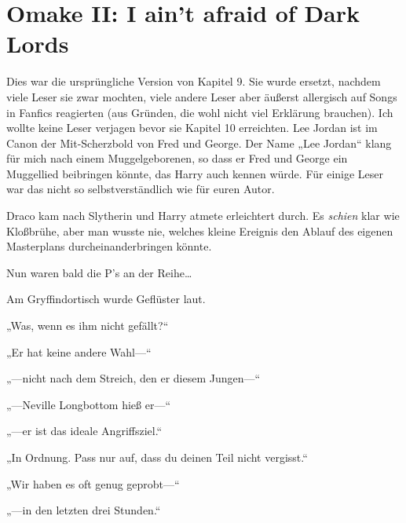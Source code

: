 


\section{Omake II: I ain’t afraid of Dark Lords}

Dies war die ursprüngliche Version von Kapitel 9. Sie wurde ersetzt, nachdem viele Leser sie zwar mochten, viele andere Leser aber äußerst allergisch auf Songs in Fanfics reagierten (aus Gründen, die wohl nicht viel Erklärung brauchen). Ich wollte keine Leser verjagen bevor sie Kapitel 10 erreichten.
Lee Jordan ist im Canon der Mit-Scherzbold von Fred und George. Der Name „Lee Jordan“ klang für mich nach einem Muggelgeborenen, so dass er Fred und George ein Muggellied beibringen könnte, das Harry auch kennen würde. Für einige Leser war das nicht so selbstverständlich wie für euren Autor.

\later

Draco kam nach Slytherin und Harry atmete erleichtert durch. Es \emph{schien} klar wie Kloßbrühe, aber man wusste nie, welches kleine Ereignis den Ablauf des eigenen Masterplans durcheinanderbringen könnte.

Nun waren bald die P’s an der Reihe…

Am Gryffindortisch wurde Geflüster laut.
\begin{em}
„Was, wenn es ihm nicht gefällt?“

„Er hat keine andere Wahl—“

„—nicht nach dem Streich, den er diesem Jungen—“

„—Neville Longbottom hieß er—“

„—er ist das ideale Angriffsziel.“

„In Ordnung. Pass nur auf, dass du deinen Teil nicht vergisst.“

„Wir haben es oft genug geprobt—“

„—in den letzten drei Stunden.“
\end{em}

